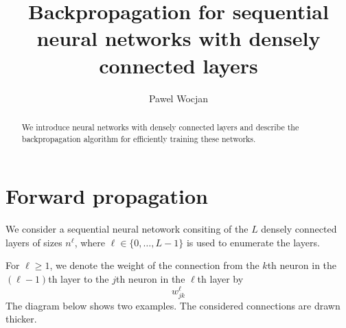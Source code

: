 \documentclass[12pt]{article}
\title{Backpropagation for sequential neural networks with densely connected layers}
\author{Pawel Wocjan}
\begin{document}
\maketitle


\begin{abstract}
We introduce neural networks with densely connected layers and describe the backpropagation algorithm for efficiently training these networks.
\end{abstract}

\section{Forward propagation}
We consider a sequential neural netowork consiting of the $L$ densely connected layers of sizes $n^\ell$, where $\ell\in\{0,\ldots,L-1\}$ is used to enumerate the layers.

For $\ell \ge 1$, we denote the weight of the connection from the $k$th neuron in the $(\ell - 1)$th layer to the $j$th neuron in the $\ell$th layer by
\begin{equation}
w^\ell_{jk}
\end{equation}
The diagram below shows two examples. The considered connections are drawn thicker.

\end{document}
